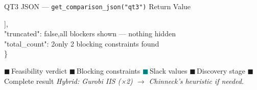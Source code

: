 \documentclass[aspectratio=169,10pt]{beamer}
\begin{document}
\begin{frame}[t]{QT3 JSON — \texttt{get\_comparison\_json("qt3")} Return Value}
\begin{block}{}
{    \quad ],\\
    \quad "truncated": false,\hfill\textcolor{lgrn}{\tiny all blockers shown — nothing hidden}\\
    \quad "total\_count": 2\hfill\textcolor{lgrn}{\tiny only 2 blocking constraints found}\\
    \}
  }
\end{block}
\vspace{1pt}
\centering\scriptsize
\textcolor{ared}{$\blacksquare$}\,Feasibility verdict\quad
\textcolor{pblue}{$\blacksquare$}\,Blocking constraints\quad
\textcolor{teal}{$\blacksquare$}\,Slack values\quad
\textcolor{aorng}{$\blacksquare$}\,Discovery stage\quad
\textcolor{lgrn}{$\blacksquare$}\,Complete result\qquad
\textcolor{mgray}{\textit{Hybrid: Gurobi IIS (×2) $\to$ Chinneck's heuristic if needed.}}
\end{frame}
\end{document}
